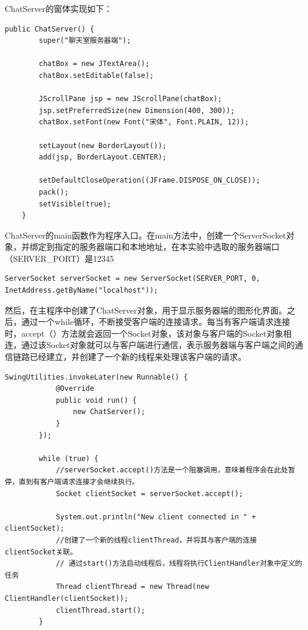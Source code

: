 \documentclass[UTF8,12pt]{article}
\begin{document}
ChatServer的窗体实现如下：
\begin{lstlisting}[title=ChatServer的窗体实现,frame=shadowbox]
    public ChatServer() {
        super("聊天室服务器端");

        chatBox = new JTextArea();
        chatBox.setEditable(false);

        JScrollPane jsp = new JScrollPane(chatBox);
        jsp.setPreferredSize(new Dimension(400, 300));
        chatBox.setFont(new Font("宋体", Font.PLAIN, 12));

        setLayout(new BorderLayout());
        add(jsp, BorderLayout.CENTER);

        setDefaultCloseOperation((JFrame.DISPOSE_ON_CLOSE));
        pack();
        setVisible(true);
    }
\end{lstlisting}

ChatServer的main函数作为程序入口。在main方法中，创建一个ServerSocket对象，并绑定到指定的服务器端口和本地地址，在本实验中选取的服务器端口（SERVER\_PORT）是12345

\begin{lstlisting}[title=ServerSocket绑定,frame=shadowbox]
    ServerSocket serverSocket = new ServerSocket(SERVER_PORT, 0, InetAddress.getByName("localhost"));
\end{lstlisting}

然后，在主程序中创建了ChatServer对象，用于显示服务器端的图形化界面。之后，通过一个while循环，不断接受客户端的连接请求。每当有客户端请求连接时，accept（）方法就会返回一个Socket对象，该对象与客户端的Socket对象相连，通过该Socket对象就可以与客户端进行通信，表示服务器端与客户端之间的通信链路已经建立，并创建了一个新的线程来处理该客户端的请求。

\begin{lstlisting}[title=服务器端接受客户端连接,frame=shadowbox]
    SwingUtilities.invokeLater(new Runnable() {
            @Override
            public void run() {
                new ChatServer();
            }
        });

        while (true) {
            //serverSocket.accept()方法是一个阻塞调用，意味着程序会在此处暂停，直到有客户端请求连接才会继续执行。
            Socket clientSocket = serverSocket.accept();

            System.out.println("New client connected in " + clientSocket);
            //创建了一个新的线程clientThread，并将其与客户端的连接clientSocket关联。
            // 通过start()方法启动线程后，线程将执行ClientHandler对象中定义的任务
            Thread clientThread = new Thread(new ClientHandler(clientSocket));
            clientThread.start();
        }
    
\end{lstlisting}
\end{document}
